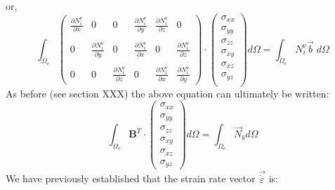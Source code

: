 or, 
\begin{equation}
\int_{\Omega_e} 
\left(
\begin{array}{cccccc}
\frac{\partial N_i^\upnu}{\partial x} & 0 & 0& 
\frac{\partial N_i^\upnu}{\partial y} & \frac{\partial N_i^\upnu}{\partial z} & 0\\  \\
0 & \frac{\partial N_i^\upnu}{\partial y} & 0  & \frac{\partial N_i^\upnu}{\partial x}  & 0 &
\frac{\partial N_i^\upnu}{\partial z}  \\ \\
0 & 0 & \frac{\partial N_i^\upnu}{\partial z} &  0 & \frac{\partial N_i^\upnu}{\partial x} &  
\frac{\partial N_i^\upnu}{\partial y} 
\end{array}
\right)
\cdot
\left(
\begin{array}{c}
\sigma_{xx}\\
\sigma_{yy}\\
\sigma_{zz}\\
\sigma_{xy}\\
\sigma_{xz}\\
\sigma_{yz}\\
\end{array}
\right)
d\Omega = \int_{\Omega_e} N_i^\upnu {\vec b} \; d\Omega 
\end{equation}
As before (see section XXX) the above equation can ultimately be written:
\begin{equation}
\int_{\Omega_e} {\bm B}^T \cdot 
\left(
\begin{array}{c}
\sigma_{xx}\\
\sigma_{yy}\\
\sigma_{zz}\\
\sigma_{xy}\\
\sigma_{xz}\\
\sigma_{yz}
\end{array}
\right)
d\Omega
=
\int_{\Omega_e} {\vec N}_b d\Omega 
\end{equation}
We have previously established that the strain rate 
vector $\vec{\dot \varepsilon}$ is:
